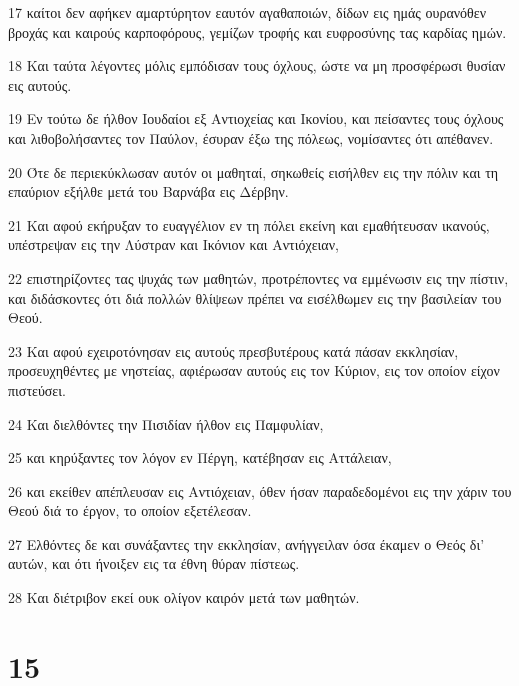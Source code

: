\par 17 καίτοι δεν αφήκεν αμαρτύρητον εαυτόν αγαθαποιών, δίδων εις ημάς ουρανόθεν βροχάς και καιρούς καρποφόρους, γεμίζων τροφής και ευφροσύνης τας καρδίας ημών.
\par 18 Και ταύτα λέγοντες μόλις εμπόδισαν τους όχλους, ώστε να μη προσφέρωσι θυσίαν εις αυτούς.
\par 19 Εν τούτω δε ήλθον Ιουδαίοι εξ Αντιοχείας και Ικονίου, και πείσαντες τους όχλους και λιθοβολήσαντες τον Παύλον, έσυραν έξω της πόλεως, νομίσαντες ότι απέθανεν.
\par 20 Ότε δε περιεκύκλωσαν αυτόν οι μαθηταί, σηκωθείς εισήλθεν εις την πόλιν και τη επαύριον εξήλθε μετά του Βαρνάβα εις Δέρβην.
\par 21 Και αφού εκήρυξαν το ευαγγέλιον εν τη πόλει εκείνη και εμαθήτευσαν ικανούς, υπέστρεψαν εις την Λύστραν και Ικόνιον και Αντιόχειαν,
\par 22 επιστηρίζοντες τας ψυχάς των μαθητών, προτρέποντες να εμμένωσιν εις την πίστιν, και διδάσκοντες ότι διά πολλών θλίψεων πρέπει να εισέλθωμεν εις την βασιλείαν του Θεού.
\par 23 Και αφού εχειροτόνησαν εις αυτούς πρεσβυτέρους κατά πάσαν εκκλησίαν, προσευχηθέντες με νηστείας, αφιέρωσαν αυτούς εις τον Κύριον, εις τον οποίον είχον πιστεύσει.
\par 24 Και διελθόντες την Πισιδίαν ήλθον εις Παμφυλίαν,
\par 25 και κηρύξαντες τον λόγον εν Πέργη, κατέβησαν εις Αττάλειαν,
\par 26 και εκείθεν απέπλευσαν εις Αντιόχειαν, όθεν ήσαν παραδεδομένοι εις την χάριν του Θεού διά το έργον, το οποίον εξετέλεσαν.
\par 27 Ελθόντες δε και συνάξαντες την εκκλησίαν, ανήγγειλαν όσα έκαμεν ο Θεός δι' αυτών, και ότι ήνοιξεν εις τα έθνη θύραν πίστεως.
\par 28 Και διέτριβον εκεί ουκ ολίγον καιρόν μετά των μαθητών.

\chapter{15}

